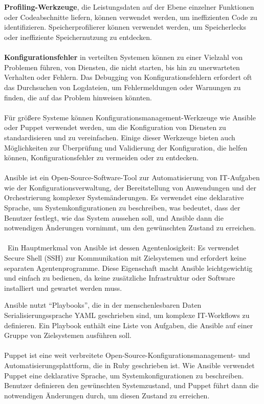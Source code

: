 \\\\
\textbf{Profiling-Werkzeuge}, die Leistungsdaten auf der Ebene einzelner Funktionen oder Codeabschnitte liefern, können verwendet werden, um ineffizienten Code zu identifizieren. Speicherprofilierer können verwendet werden, um Speicherlecks oder ineffiziente Speichernutzung zu entdecken. 
\\\\
\textbf{Konfigurationsfehler} in verteilten Systemen können zu einer Vielzahl von Problemen führen, von Diensten, die nicht starten, bis hin zu unerwarteten Verhalten oder Fehlern. Das Debugging von Konfigurationsfehlern erfordert oft das Durchsuchen von Logdateien, um Fehlermeldungen oder Warnungen zu finden, die auf das Problem hinweisen könnten.
\\\\
Für größere Systeme können Konfigurationsmanagement-Werkzeuge wie Ansible oder Puppet verwendet werden, um die Konfiguration von Diensten zu standardisieren und zu vereinfachen. Einige dieser Werkzeuge bieten auch Möglichkeiten zur Überprüfung und Validierung der Konfiguration, die helfen können, Konfigurationsfehler zu vermeiden oder zu entdecken.
\\\\
Ansible ist ein Open-Source-Software-Tool zur Automatisierung von IT-Aufgaben wie der Konfigurationsverwaltung, der Bereitstellung von Anwendungen und der Orchestrierung komplexer Systemänderungen. Es verwendet eine deklarative Sprache, um Systemkonfigurationen zu beschreiben, was bedeutet, dass der Benutzer festlegt, wie das System aussehen soll, und Ansible dann die notwendigen Änderungen vornimmt, um den gewünschten Zustand zu erreichen.
\\\\\
Ein Hauptmerkmal von Ansible ist dessen Agentenlosigkeit: Es verwendet Secure Shell (SSH) zur Kommunikation mit Zielsystemen und erfordert keine separaten Agentenprogramme. Diese Eigenschaft macht Ansible leichtgewichtig und einfach zu bedienen, da keine zusätzliche Infrastruktur oder Software installiert und gewartet werden muss.

Ansible nutzt \enquote{Playbooks}, die in der menschenlesbaren Daten Serialisierungssprache YAML geschrieben sind, um komplexe IT-Workflows zu definieren. Ein Playbook enthält eine Liste von Aufgaben, die Ansible auf einer Gruppe von Zielsystemen ausführen soll.
\\\\
Puppet ist eine weit verbreitete Open-Source-Konfigurationsmanagement- und Automatisierungsplattform, die in Ruby geschrieben ist. Wie Ansible verwendet Puppet eine deklarative Sprache, um Systemkonfigurationen zu beschreiben. Benutzer definieren den gewünschten Systemzustand, und Puppet führt dann die notwendigen Änderungen durch, um diesen Zustand zu erreichen.

